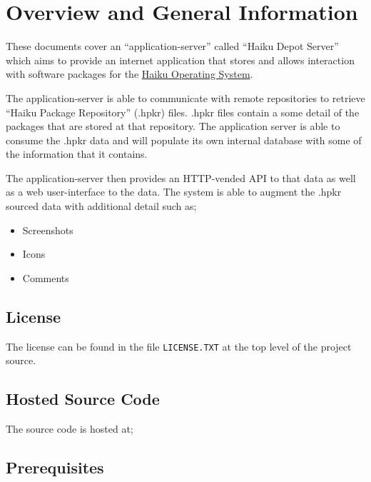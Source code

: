 
\section{Overview and General Information}

These documents cover an ``application-server'' called ``Haiku Depot Server'' which aims to provide an internet application that stores and allows interaction with software packages for the \href{http://www.haiku-os.org}{Haiku Operating System}.

The application-server is able to communicate with remote repositories to retrieve ``Haiku Package Repository'' (.hpkr) files.  .hpkr files contain a some detail of the packages that are stored at that repository.  The application server is able to consume the .hpkr data and will populate its own internal database with some of the information that it contains.

The application-server then provides an HTTP-vended API to that data as well as a web user-interface to the data.  The system is able to augment the .hpkr sourced data with additional detail such as;

\begin{itemize}
\item Screenshots
\item Icons
\item Comments
\end{itemize}

\subsection{License}

The license can be found in the file {\tt LICENSE.TXT} at the top level of the project source.

\subsection{Hosted Source Code}

The source code is hosted at;


\subsection{Prerequisites}
\label{prerequisites}


